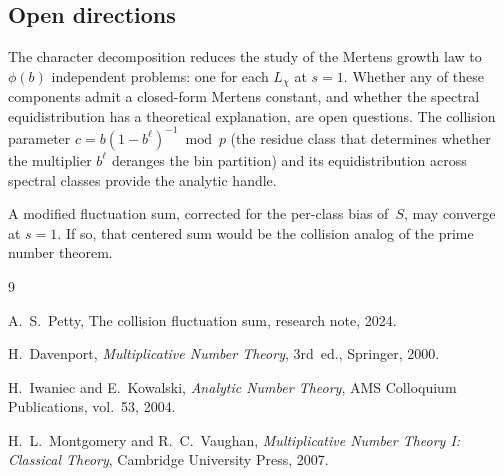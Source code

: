 \documentclass[12pt]{amsart}
\theoremstyle{definition}
\theoremstyle{remark}
\begin{document}
\subsection*{Open directions}

The character decomposition reduces the study of the Mertens
growth law to $\phi(b)$ independent problems: one for each
$L_{\chi}$ at $s = 1$. Whether any of these components admit
a closed-form Mertens constant, and whether the spectral
equidistribution has a theoretical explanation, are open
questions. The collision parameter
$c = b(1 - b^{\ell})^{-1} \bmod p$ (the residue class
that determines whether the multiplier $b^{\ell}$
deranges the bin partition) and its equidistribution
across spectral classes provide the analytic handle.

A modified fluctuation sum, corrected for the per-class
bias of~$S$, may converge at $s = 1$. If so, that centered
sum would be the collision analog of the prime number theorem.

\begin{thebibliography}{9}

A.~S.~Petty,
The collision fluctuation sum,
research note, 2024.

H.~Davenport,
\emph{Multiplicative Number Theory},
3rd~ed., Springer, 2000.

H.~Iwaniec and E.~Kowalski,
\emph{Analytic Number Theory},
AMS Colloquium Publications, vol.~53, 2004.

H.~L.~Montgomery and R.~C.~Vaughan,
\emph{Multiplicative Number Theory I: Classical Theory},
Cambridge University Press, 2007.

\end{thebibliography}
\end{document}
